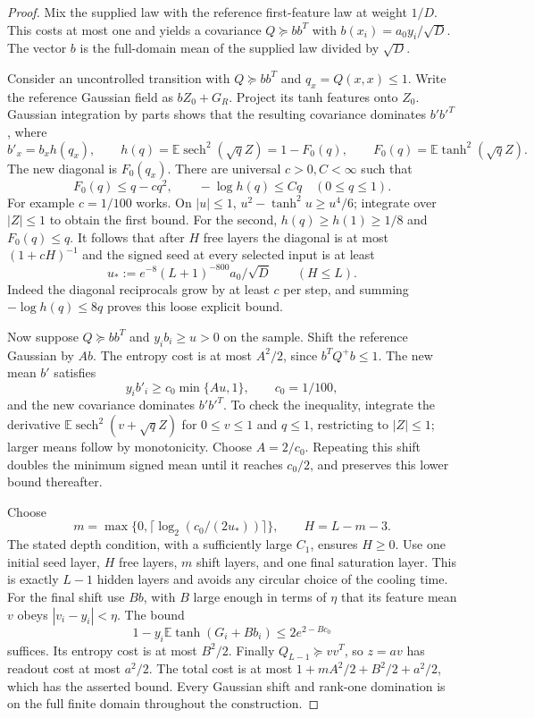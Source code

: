 \begin{proof}
Mix the supplied law with the reference first-feature law at weight
$1/D$. This costs at most one and yields a covariance $Q\succeq bb^T$
with $b(x_i)=a_0y_i/\sqrt D$. The vector $b$ is the full-domain mean
of the supplied law divided by $\sqrt D$.

Consider an uncontrolled transition with $Q\succeq bb^T$ and
$q_x=Q(x,x)\le1$. Write the reference Gaussian field as $bZ_0+G_R$.
Project its tanh features onto $Z_0$. Gaussian integration by parts
shows that the resulting covariance dominates $b'b'^T$, where
\[
 b'_x=b_xh(q_x),\qquad
 h(q)=\mathbb E\operatorname{sech}^2(\sqrt qZ)=1-F_0(q),\qquad
 F_0(q)=\mathbb E\tanh^2(\sqrt qZ).
\]
The new diagonal is $F_0(q_x)$. There are universal $c>0,C<\infty$
such that
\[
 F_0(q)\le q-cq^2,\qquad -\log h(q)\le Cq\quad(0\le q\le1).
\]
For example $c=1/100$ works. On $|u|\le1$,
$u^2-\tanh^2u\ge u^4/6$; integrate over $|Z|\le1$ to obtain the
first bound. For the second, $h(q)\ge h(1)\ge1/8$ and $F_0(q)\le q$.
It follows that after $H$ free layers the diagonal is at most
$(1+cH)^{-1}$ and the signed seed at every selected input is at least
\begin{equation}\label{eq:critical-free-seed}
 u_*:=e^{-8}(L+1)^{-800}a_0/\sqrt D
 \qquad(H\le L).
\end{equation}
Indeed the diagonal reciprocals grow by at least $c$ per step, and
summing $-\log h(q)\le8q$ proves this loose explicit bound.

Now suppose $Q\succeq bb^T$ and $y_ib_i\ge u>0$ on the sample.
Shift the reference Gaussian by $A b$. The entropy cost is at most
$A^2/2$, since $b^TQ^+b\le1$. The new mean $b'$ satisfies
\[
 y_i b'_i\ge c_0\min\{Au,1\},\qquad c_0=1/100,
\]
and the new covariance dominates $b'b'^T$. To check the inequality,
integrate the derivative
$\mathbb E\operatorname{sech}^2(v+\sqrt qZ)$ for $0\le v\le1$
and $q\le1$, restricting to $|Z|\le1$; larger means follow by
monotonicity. Choose $A=2/c_0$. Repeating this shift doubles the
minimum signed mean until it reaches $c_0/2$, and preserves this
lower bound thereafter.

Choose
\[
 m=\max\{0,\lceil\log_2(c_0/(2u_*))\rceil\},\qquad
 H=L-m-3.
\]
The stated depth condition, with a sufficiently large $C_1$, ensures
$H\ge0$. Use one initial seed layer, $H$ free layers, $m$ shift
layers, and one final saturation layer. This is exactly $L-1$ hidden
layers and avoids any circular choice of the cooling time.
For the final shift use $B b$, with $B$ large enough in terms of
$\eta$ that its feature mean $v$ obeys $|v_i-y_i|<\eta$.
The bound
\[
 1-y_i\mathbb E\tanh(G_i+B b_i)\le2e^{2-Bc_0}
\]
suffices. Its entropy cost is at most $B^2/2$. Finally $Q_{L-1}\succeq vv^T$,
so $z=av$ has readout cost at most $a^2/2$.
The total cost is at most $1+mA^2/2+B^2/2+a^2/2$, which has the
asserted bound. Every Gaussian shift and rank-one domination is on
the full finite domain throughout the construction.
\end{proof}

